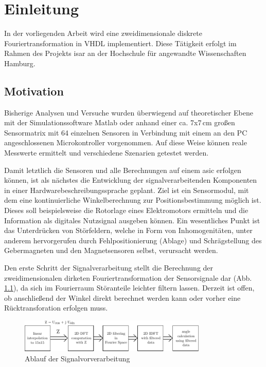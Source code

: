 \chapter{Einleitung}
In der vorliegenden Arbeit wird eine zweidimensionale diskrete Fouriertransformation in VHDL implementiert. Diese Tätigkeit erfolgt im Rahmen des Projekts \gls{isar} an der 
Hochschule für angewandte Wissenschaften Hamburg.
 \section{Motivation}
 Bisherige Analysen und Versuche wurden überwiegend auf theoretischer Ebene mit der Simulationssoftware Matlab oder anhand einer ca. 7x7\,cm großen Sensormatrix mit 64 einzelnen Sensoren in Verbindung mit
 einem an den PC angeschlossenen Microkontroller vorgenommen. Auf diese Weise können reale Messwerte ermittelt und verschiedene Szenarien getestet werden.
 
 Damit letztlich die Sensoren und alle Berechnungen auf einem \gls{asic} erfolgen können, ist als nächstes die Entwicklung der signalverarbeitenden Komponenten in einer Hardwarebeschreibungssprache geplant.
 Ziel ist ein Sensormodul, mit dem eine kontinuierliche Winkelberechnung zur Positionsbestimmung möglich ist. Dieses soll beispielsweise die Rotorlage eines Elektromotors ermitteln und die Information als digitales Nutzsignal ausgeben können. Ein wesentliches Punkt ist das Unterdrücken von Störfeldern, welche in Form von Inhomogenitäten, unter anderem hervorgerufen durch Fehlpositionierung (Ablage) und Schrägstellung des Gebermagneten und den Magnetsensoren selbst, verursacht werden. 

 Den erste Schritt der Signalverarbeitung stellt die Berechnung der zweidimensionalen dirketen Fouriertransformation der Sensorsignale dar (Abb. \ref{pic:AblaufFourier}), da sich im Fourierraum Störanteile leichter filtern lassen. Derzeit ist offen, ob anschließend der Winkel direkt berechnet werden kann oder vorher eine Rücktransforation erfolgen muss.
 

\begin{figure}[ht!]
 \centering
 \includegraphics[width=0.8\textwidth]{img/AblaufFourier.pdf}
 \caption{Ablauf der Signalvorverarbeitung~\autocite[9]{krrts2017freqfilt}}
 \label{pic:AblaufFourier}
\end{figure}


